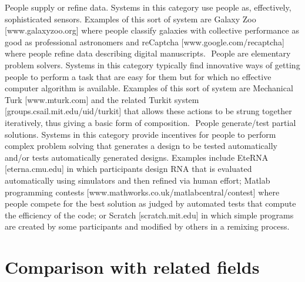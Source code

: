 \documentclass{sig-alternate}
\begin{document}
People  supply  or  refine  data.    Systems  in  this  category  use  people  as,  effectively,  sophisticated  sensors.
Examples of  this  sort of  system  are Galaxy  Zoo  [www.galaxyzoo.org] where people  classify  galaxies with
collective performance as good as professional astronomers and reCaptcha [www.google.com/recaptcha]
where people refine data describing digital manuscripts.
 People are elementary problem solvers. Systems in this category typically find innovative ways of getting
people to perform a task that are easy for them but for which no effective computer algorithm is available.
Examples  of  this  sort  of  system  are Mechanical  Turk  [www.mturk.com]  and  the  related  Turkit  system
[groups.csail.mit.edu/uid/turkit]  that  allows  these  actions  to  be  strung  together  iteratively,  thus  giving  a
basic form of composition.
 People generate/test partial  solutions. Systems  in  this  category provide  incentives  for people  to perform
complex  problem  solving  that  generates  a  design  to  be  tested  automatically  and/or  tests  automatically
generated  designs.    Examples  include  EteRNA  [eterna.cmu.edu]  in which  participants  design RNA  that  is
evaluated automatically using simulators and then refined via human effort; Matlab programming contests
[www.mathworks.co.uk/matlabcentral/contest] where people compete for the best solution as judged by automated  tests  that  compute  the  efficiency  of  the  code;  or  Scratch  [scratch.mit.edu]  in  which  simple programs are created by some participants and modified by others in a remixing process.


\section{Comparison with related fields}
\end{document}

